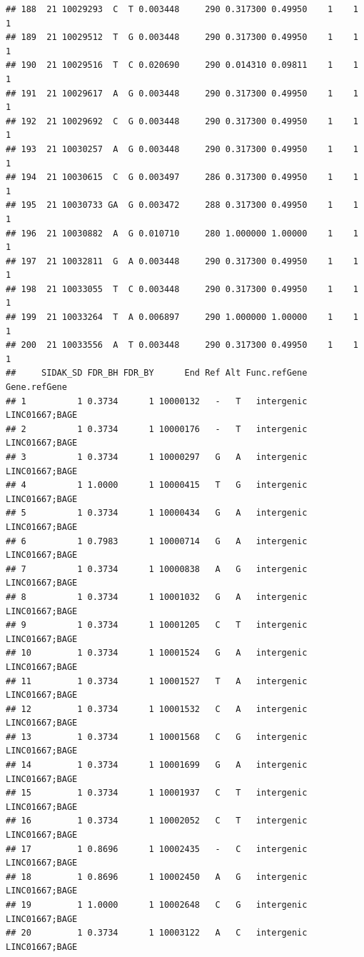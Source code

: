 \documentclass[
]{article}
\begin{document}
\begin{verbatim}
## 188  21 10029293  C  T 0.003448     290 0.317300 0.49950    1    1        1
## 189  21 10029512  T  G 0.003448     290 0.317300 0.49950    1    1        1
## 190  21 10029516  T  C 0.020690     290 0.014310 0.09811    1    1        1
## 191  21 10029617  A  G 0.003448     290 0.317300 0.49950    1    1        1
## 192  21 10029692  C  G 0.003448     290 0.317300 0.49950    1    1        1
## 193  21 10030257  A  G 0.003448     290 0.317300 0.49950    1    1        1
## 194  21 10030615  C  G 0.003497     286 0.317300 0.49950    1    1        1
## 195  21 10030733 GA  G 0.003472     288 0.317300 0.49950    1    1        1
## 196  21 10030882  A  G 0.010710     280 1.000000 1.00000    1    1        1
## 197  21 10032811  G  A 0.003448     290 0.317300 0.49950    1    1        1
## 198  21 10033055  T  C 0.003448     290 0.317300 0.49950    1    1        1
## 199  21 10033264  T  A 0.006897     290 1.000000 1.00000    1    1        1
## 200  21 10033556  A  T 0.003448     290 0.317300 0.49950    1    1        1
##     SIDAK_SD FDR_BH FDR_BY      End Ref Alt Func.refGene   Gene.refGene
## 1          1 0.3734      1 10000132   -   T   intergenic LINC01667;BAGE
## 2          1 0.3734      1 10000176   -   T   intergenic LINC01667;BAGE
## 3          1 0.3734      1 10000297   G   A   intergenic LINC01667;BAGE
## 4          1 1.0000      1 10000415   T   G   intergenic LINC01667;BAGE
## 5          1 0.3734      1 10000434   G   A   intergenic LINC01667;BAGE
## 6          1 0.7983      1 10000714   G   A   intergenic LINC01667;BAGE
## 7          1 0.3734      1 10000838   A   G   intergenic LINC01667;BAGE
## 8          1 0.3734      1 10001032   G   A   intergenic LINC01667;BAGE
## 9          1 0.3734      1 10001205   C   T   intergenic LINC01667;BAGE
## 10         1 0.3734      1 10001524   G   A   intergenic LINC01667;BAGE
## 11         1 0.3734      1 10001527   T   A   intergenic LINC01667;BAGE
## 12         1 0.3734      1 10001532   C   A   intergenic LINC01667;BAGE
## 13         1 0.3734      1 10001568   C   G   intergenic LINC01667;BAGE
## 14         1 0.3734      1 10001699   G   A   intergenic LINC01667;BAGE
## 15         1 0.3734      1 10001937   C   T   intergenic LINC01667;BAGE
## 16         1 0.3734      1 10002052   C   T   intergenic LINC01667;BAGE
## 17         1 0.8696      1 10002435   -   C   intergenic LINC01667;BAGE
## 18         1 0.8696      1 10002450   A   G   intergenic LINC01667;BAGE
## 19         1 1.0000      1 10002648   C   G   intergenic LINC01667;BAGE
## 20         1 0.3734      1 10003122   A   C   intergenic LINC01667;BAGE

\end{verbatim}
\end{document}
